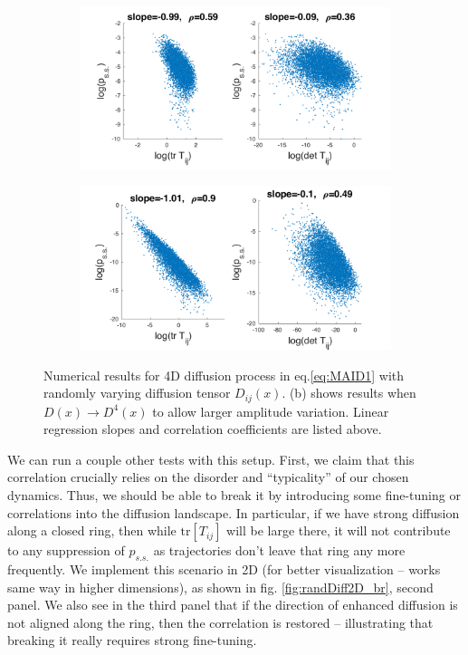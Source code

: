 \documentclass[reprint,prx]{revtex4-1}
\newcommand{\tr}{\mbox{tr}}
\renewcommand{\=}[1]{\stackrel{#1}{=}} %
\renewcommand{\(}{\left (}
\renewcommand{\)}{\right  )}
\renewcommand{\[}{\left [}
\renewcommand{\]}{\right ]}
\newcommand{\<}{\left <}
\renewcommand{\>}{\right >}
\theoremstyle{definition}
\theoremstyle{remark}
\begin{document}
\begin{figure} 
	\begin{subfigure}[t]{0.5\textwidth}
		\caption{\label{fig:randDiff4D}}
		\includegraphics[width=1\textwidth]{randDiff4D.pdf}
	\end{subfigure}
	\begin{subfigure}[t]{0.5\textwidth}
		\caption{\label{fig:randDiff4D_p4}}
		\includegraphics[width=1\textwidth]{randDiff4D_p4.pdf}
	\end{subfigure}
	\caption{Numerical results for 4D diffusion process in eq.\ref{eq:MAID1} with randomly varying diffusion tensor $ D_{ij}(x) $. (b) shows results when $ D(x) \rightarrow D^4(x) $ to allow larger amplitude variation. Linear regression slopes and correlation coefficients are listed above.} \label{fig:randDiff}
\end{figure}

We can run a couple other tests with this setup. First, we claim that this correlation crucially relies on the disorder and ``typicality'' of our chosen dynamics. Thus, we should be able to break it by introducing some fine-tuning or correlations into the diffusion landscape. In particular, if we have strong diffusion along a closed ring, then while $ \tr\[T_{ij}\] $ will be large there, it will not contribute to any suppression of $ p_{s.s.} $ as trajectories don't leave that ring any more frequently. We implement this scenario in 2D (for better visualization -- works same way in higher dimensions), as shown in fig. \ref{fig:randDiff2D_br}, second panel. We also see in the third panel that if the direction of enhanced diffusion is not aligned along the ring, then the correlation is restored -- illustrating that breaking it really requires strong fine-tuning.
\end{document}
